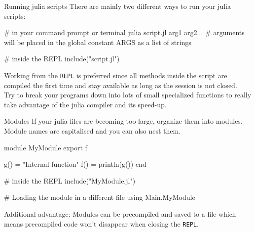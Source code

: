 \documentclass{beamer}
\newenvironment{Boxx}{\begin{tcolorbox}[standard jigsaw, opacityframe=0.8, opacityback=0.0]}{\end{tcolorbox}}
\begin{document}
\begin{frame}[fragile]{Running julia scripts}
	There are mainly two different ways to run your julia scripts:
	\begin{Boxx}
 \begin{jllisting}
  # in your command prompt or terminal
  julia script.jl arg1 arg2...
  # arguments will be placed in the global constant ARGS as a list of strings
  
  # inside the REPL
  include("script.jl")
\end{jllisting}
\end{Boxx}
Working from the \verb|REPL| is preferred since all methods inside the script are compiled the first time and stay available as long as the session is not closed.\\

\vspace{4mm}
Try to break your programs down into lots of small specialized functions to really take advantage of the julia compiler and its speed-up.
\end{frame}


\begin{frame}[fragile]{Modules}
If your julia files are becoming too large, organize them into modules. Module names are capitalised and you can also nest them.
\begin{Boxx}
  \begin{jllisting}
  module MyModule
    export f

    g() = "Internal function"
    f() = println(g())
  end
  
  # inside the REPL
  include("MyModule.jl")
  
  # Loading the module in a different file
  using Main.MyModule
  \end{jllisting}
\end{Boxx}
Additional advantage: Modules can be precompiled and saved to a file which means precompiled code won't disappear when closing the \verb|REPL|.
\end{frame}
\end{document}
